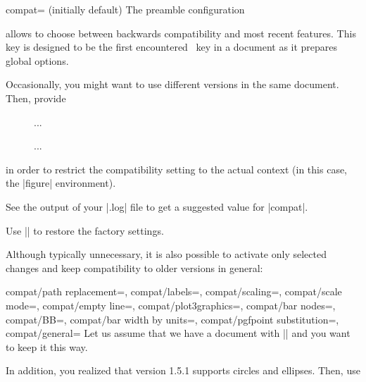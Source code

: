 \begin{pgfplotskey}{compat= (initially default)}
	The preamble configuration 
\begin{codeexample}
\usepackage{pgfplots}
\pgfplotsset{compat=1.14}
\end{codeexample}
	allows to choose between backwards compatibility and most recent features. This key is designed to be the first encountered \PGFPlots\ key in a document as it prepares global options.

	Occasionally, you might want to use different versions in the same document. Then, provide
\begin{codeexample}
\begin{figure}
	\pgfplotsset{compat=1.4}
	...
	\caption{...}
\end{figure}
\end{codeexample}
	\noindent in order to restrict the compatibility setting to the actual context (in this case, the |figure| environment).

	See the output of your |.log| file to get a suggested value for |compat|.

	Use |\pgfplotsset{compat=default}| to restore the factory settings.

	Although typically unnecessary, it is also possible to activate only selected changes and keep compatibility to older versions in general:
	\begin{pgfplotskeylist}{%
		compat/path replacement=,%
		compat/labels=,%
		compat/scaling=,%
		compat/scale mode=,%
		compat/empty line=,%
		compat/plot3graphics=,%
		compat/bar nodes=,%
		compat/BB=,%
		compat/bar width by units=,%
		compat/pgfpoint substitution=,%
		compat/general=%
	}
	Let us assume that we have a document with |\pgfplotsset{compat=1.3}| and you want to keep it this way.

	In addition, you realized that version 1.5.1 supports circles and ellipses. Then, use
\begin{codeexample}[]
\pgfplotsset{compat=1.3,compat/path replacement=1.5.1}
\end{codeexample}
	

\end{pgfplotskeylist}
\end{pgfplotskey}
